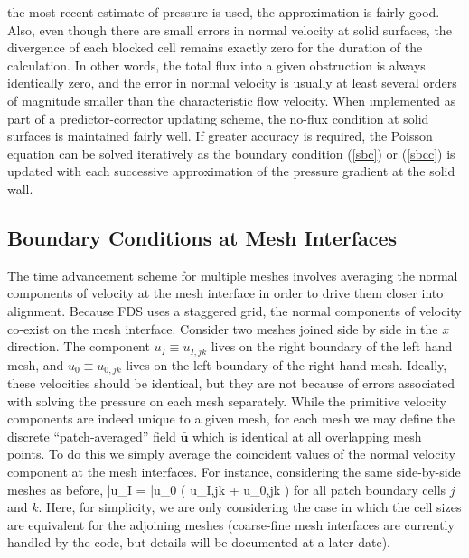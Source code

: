 the most recent estimate of pressure is used, the approximation is fairly
good. Also, even though there are small errors in normal velocity at solid
surfaces, the divergence of each blocked cell
remains exactly zero for the duration of the calculation.
In other words, the total flux into a given obstruction is always identically
zero, and the error in normal velocity is usually at least
several orders of magnitude smaller than the characteristic flow velocity.
When implemented as part of a predictor-corrector updating scheme,
the no-flux condition at solid surfaces is maintained fairly well. If greater accuracy is
required, the Poisson equation can be solved iteratively as the boundary condition (\ref{sbc}) or (\ref{sbcc}) is updated with
each successive approximation of the pressure gradient at the solid wall.



\subsection{Boundary Conditions at Mesh Interfaces}
\label{app_pressure_correction}

The time advancement scheme for multiple meshes involves averaging the normal components of velocity at the mesh interface in
order to drive them closer into alignment. Because FDS uses a staggered grid, the normal components of velocity co-exist on the mesh interface.
Consider two meshes joined side by side in the $x$ direction. The component $u_I \equiv u_{I,jk}$ lives on the right boundary of the left hand mesh, and
$u_0 \equiv u_{0,jk}$ lives on the left boundary of the right hand mesh.
Ideally, these velocities should be identical, but they are not because of errors associated with solving the pressure on each mesh separately.
While the primitive velocity components are indeed unique to a given mesh, for each mesh we may define the
discrete ``patch-averaged'' field $\bar{\mathbf{u}}$ which is identical at all overlapping mesh points.
To do this we simply average the coincident values of the normal velocity component at the mesh interfaces.
For instance, considering the same side-by-side meshes as before,
\be
\label{eqn_patchave_ufield}
\bar{u}_I = \bar{u}_0 \equiv {} \left( u_{I,jk} + u_{0,jk} \right)
\ee
for all patch boundary cells $j$ and $k$. Here, for simplicity, we are only considering the case in which the
cell sizes are equivalent for the adjoining meshes (coarse-fine mesh interfaces are currently handled by the code,
but details will be documented at a later date).

